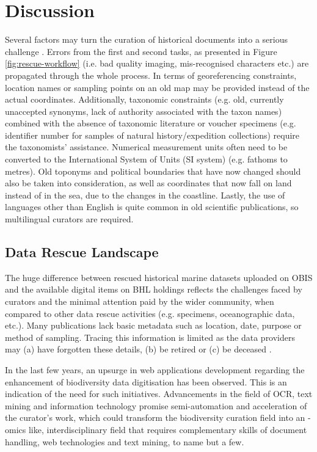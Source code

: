 \section{Discussion}
\label{sec:deco-discussion}

Several factors may turn the curation of historical documents into a
serious challenge \parencite{faulwetter_emodnet_2016,beja_chapter_2022}.
Errors from the first and second tasks, as presented in Figure 
\ref{fig:rescue-workflow} (i.e. bad quality imaging, mis-recognised characters etc.)
are propagated through the whole process. In terms of georeferencing
constraints, location names or sampling points on an old map may be provided
instead of the actual coordinates. Additionally, taxonomic constraints
(e.g. old, currently unaccepted synonyms, lack of authority associated with the
taxon names) combined with the absence of taxonomic literature or voucher
specimens (e.g. identifier number for samples of natural history/expedition
collections) require the taxonomists’ assistance. Numerical measurement units
often need to be converted to the International System of Units (SI system)
(e.g. fathoms to metres)\parencite{calder_proposal_1982,wieczorek_darwin_2012}.
Old toponyms and political boundaries that have now changed should also be
taken into consideration, as well as coordinates that now fall on land instead
of in the sea, due to the changes in the coastline. Lastly, the use of
languages other than English is quite common in old scientific publications, so
multilingual curators are required. 

   \subsection{Data Rescue Landscape}
   The huge difference between rescued historical marine datasets uploaded on
OBIS and the available digital items on BHL holdings reflects the challenges
faced by curators and the minimal attention paid by the wider community,
when compared to other data rescue activities (e.g. specimens, oceanographic
data, etc.). Many publications lack basic metadata such as location, date,
purpose or method of sampling. Tracing this information is limited as the data
providers may (a) have forgotten these details, (b) be retired or (c) be
deceased \parencite{michener_nongeospatial_1997}.

In the last few years, an upsurge in web applications development regarding the
enhancement of biodiversity data digitisation has been observed. This is an
indication of the need for such initiatives. Advancements in the field of OCR,
text mining and information technology promise semi-automation and acceleration
of the curator’s work, which could transform the biodiversity curation field
into an -omics like, interdisciplinary field that requires complementary skills
of document handling, web technologies and text mining, to name but a few.

